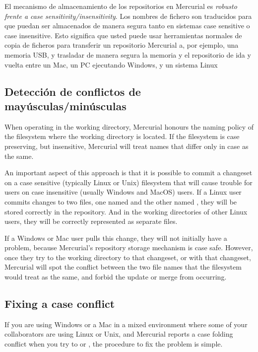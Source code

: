 El mecanismo de almacenamiento de los repositorios en Mercurial es
\emph{robusto frente a case sensitivity/insensitivity}. Los nombres de
fichero son traducidos para que puedan ser almacenados de manera
segura tanto en sistemas case sensitive o case insensitive. Esto
significa que usted puede usar herramientas normales de copia de
ficheros para transferir un repositorio Mercurial a, por ejemplo, una
memoria USB, y trasladar de manera segura la memoria y el repositorio
de ida y vuelta entre un Mac, un PC ejecutando Windows, y un sistema
Linux

\subsection{Detección de conflictos de mayúsculas/minúsculas}

When operating in the working directory, Mercurial honours the naming
policy of the filesystem where the working directory is located.  If
the filesystem is case preserving, but insensitive, Mercurial will
treat names that differ only in case as the same.

An important aspect of this approach is that it is possible to commit
a changeset on a case sensitive (typically Linux or Unix) filesystem
that will cause trouble for users on case insensitive (usually Windows
and MacOS) users.  If a Linux user commits changes to two files, one
named  and the other named ,
they will be stored correctly in the repository.  And in the working
directories of other Linux users, they will be correctly represented
as separate files.

If a Windows or Mac user pulls this change, they will not initially
have a problem, because Mercurial's repository storage mechanism is
case safe.  However, once they try to  the working
directory to that changeset, or  with that changeset,
Mercurial will spot the conflict between the two file names that the
filesystem would treat as the same, and forbid the update or merge
from occurring.

\subsection{Fixing a case conflict}

If you are using Windows or a Mac in a mixed environment where some of
your collaborators are using Linux or Unix, and Mercurial reports a
case folding conflict when you try to  or ,
the procedure to fix the problem is simple.

